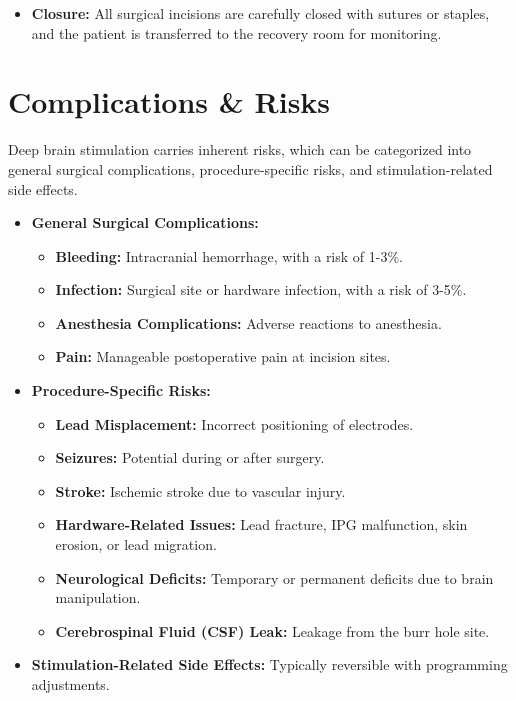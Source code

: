 \begin{itemize}
  \item \textbf{Closure:} All surgical incisions are carefully closed with sutures or staples, and the patient is transferred to the recovery room for monitoring.
\end{itemize}

\section*{Complications \& Risks}
Deep brain stimulation carries inherent risks, which can be categorized into general surgical complications, procedure-specific risks, and stimulation-related side effects.

\begin{itemize}
  \item \textbf{General Surgical Complications:}
    \begin{itemize}
      \item \textbf{Bleeding:} Intracranial hemorrhage, with a risk of 1-3\%.
      \item \textbf{Infection:} Surgical site or hardware infection, with a risk of 3-5\%.
      \item \textbf{Anesthesia Complications:} Adverse reactions to anesthesia.
      \item \textbf{Pain:} Manageable postoperative pain at incision sites.
    \end{itemize}
  \item \textbf{Procedure-Specific Risks:}
    \begin{itemize}
      \item \textbf{Lead Misplacement:} Incorrect positioning of electrodes.
      \item \textbf{Seizures:} Potential during or after surgery.
      \item \textbf{Stroke:} Ischemic stroke due to vascular injury.
      \item \textbf{Hardware-Related Issues:} Lead fracture, IPG malfunction, skin erosion, or lead migration.
      \item \textbf{Neurological Deficits:} Temporary or permanent deficits due to brain manipulation.
      \item \textbf{Cerebrospinal Fluid (CSF) Leak:} Leakage from the burr hole site.
    \end{itemize}
  \item \textbf{Stimulation-Related Side Effects:} Typically reversible with programming adjustments.
    \begin{itemize}

\end{itemize}
\end{itemize}
